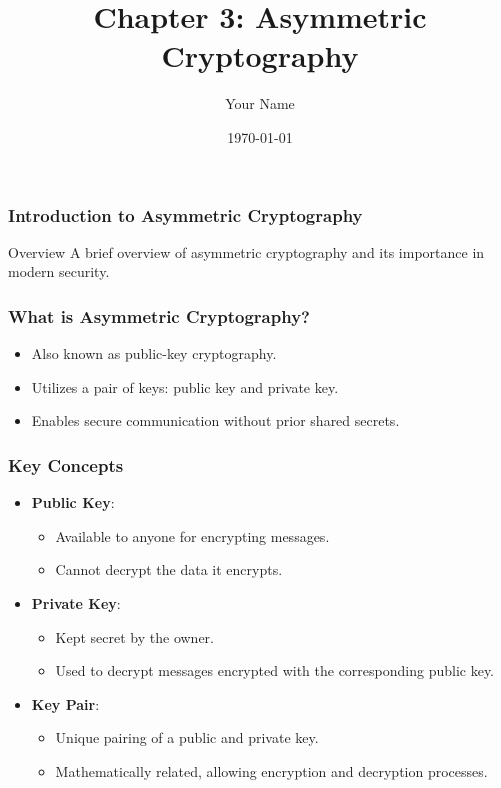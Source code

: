 \documentclass{beamer}
\title{Chapter 3: Asymmetric Cryptography}
\author{Your Name}
\institute{Your Institution}
\date{\today}
\begin{document}
\frame{\titlepage}

\begin{frame}[fragile]
    \frametitle{Introduction to Asymmetric Cryptography}
    \begin{block}{Overview}
        A brief overview of asymmetric cryptography and its importance in modern security.
    \end{block}
\end{frame}

\begin{frame}[fragile]
    \frametitle{What is Asymmetric Cryptography?}
    \begin{itemize}
        \item Also known as public-key cryptography.
        \item Utilizes a pair of keys: public key and private key. 
        \item Enables secure communication without prior shared secrets.
    \end{itemize}
\end{frame}

\begin{frame}[fragile]
    \frametitle{Key Concepts}
    \begin{itemize}
        \item \textbf{Public Key}: 
        \begin{itemize}
            \item Available to anyone for encrypting messages.
            \item Cannot decrypt the data it encrypts.
        \end{itemize}
        
        \item \textbf{Private Key}: 
        \begin{itemize}
            \item Kept secret by the owner.
            \item Used to decrypt messages encrypted with the corresponding public key.
        \end{itemize}
        
        \item \textbf{Key Pair}: 
        \begin{itemize}
            \item Unique pairing of a public and private key.
            \item Mathematically related, allowing encryption and decryption processes.
        \end{itemize}
    \end{itemize}
\end{frame}
\end{document}
